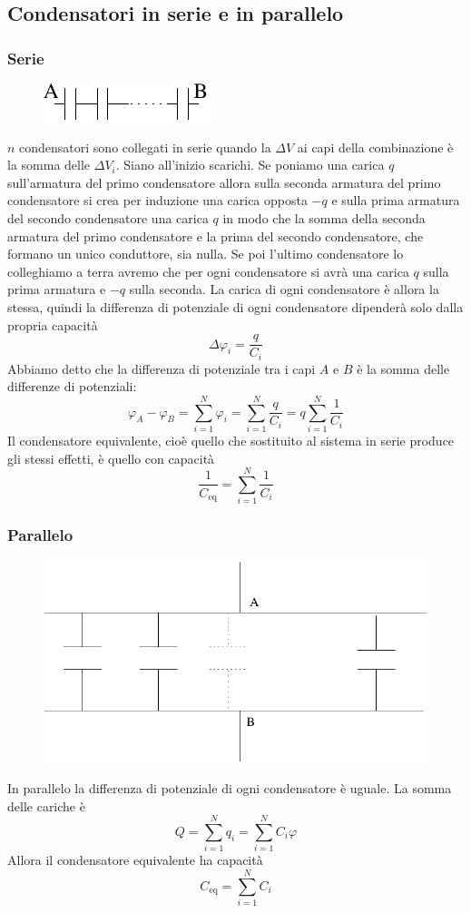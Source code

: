 \subsection{Condensatori in serie e in parallelo}
\subsubsection{Serie}
\begin{figure}[htbp]
  \centering
  \includegraphics[scale=1.2]{immagini/fisica2/cond2}
\end{figure}
$n$ condensatori sono collegati in serie quando la $\Delta V$ ai capi della combinazione è la somma delle $\Delta V_i$. Siano all'inizio scarichi. Se poniamo una carica $q$ sull'armatura del primo condensatore allora sulla seconda armatura del primo condensatore si crea per induzione una carica opposta $-q$ e sulla prima armatura del secondo condensatore una carica $q$ in modo che la somma della seconda armatura del primo condensatore e la prima del secondo condensatore, che formano un unico conduttore, sia nulla. Se poi l'ultimo condensatore lo colleghiamo a terra avremo che per ogni condensatore si avrà una carica $q$ sulla prima armatura e $-q$ sulla seconda. La carica di ogni condensatore è allora la stessa, quindi la differenza di potenziale di ogni condensatore dipenderà solo dalla propria capacità
\[\Delta\varphi_i=\frac{q}{C_i}\]
Abbiamo detto che la differenza di potenziale tra i capi $A$ e $B$ è la somma delle differenze di potenziali:
\[\varphi_A-\varphi_B=\sum_{i=1}^N\varphi_i=\sum_{i=1}^N\frac{q}{C_i}=q\sum_{i=1}^N\frac{1}{C_i}\]
Il condensatore equivalente, cioè quello che sostituito al sistema in serie produce gli stessi effetti, è quello con capacità
\[\frac{1}{C_\text{eq}}=\sum_{i=1}^N\frac{1}{C_i}\]
\subsubsection{Parallelo}
\begin{figure}[htbp]
  \centering
  \includegraphics[scale=0.5]{immagini/fisica2/cond3}
\end{figure}
In parallelo la differenza di potenziale di ogni condensatore è uguale. La somma delle cariche è
\[Q=\sum_{i=1}^N q_i=\sum_{i=1}^N C_i\varphi\]
Allora il condensatore equivalente ha capacità
\[C_\text{eq}=\sum_{i=1}^N C_i\]

